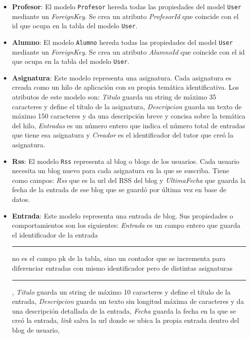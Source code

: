 \documentclass[a4paper, 12pt]{book}
\begin{document}
\begin{itemize}
  \texttt{User} contendr\'a todos los usuarios de aplicaci\'on previamente registrados, y ninguno de \'estos podr\'a coincidir con otro en nombre de usuario
  puesto que en la p\'agina de registro se aplica un filtro al introducir el dato \textit{Username}.
  \item {\bfseries Profesor}: El modelo \texttt{Profesor} hereda todas las propiedades del model \texttt{User} mediante un \textit{ForeignKey}. Se crea un
  atributo \textit{ProfesorId} que coincide con el id que ocupa en la tabla del modelo \texttt{User}.
  \item {\bfseries Alumno}: El modelo \texttt{Alumno} hereda todas las propiedades del model \texttt{User} mediante un \textit{ForeignKey}. Se crea un
  atributo \textit{AlumnoId} que coincide con el id que ocupa en la tabla del modelo \texttt{User}.
  \item {\bfseries Asignatura}: Este modelo representa una asignatura. Cada asignatura es creada como un hilo de aplicaci\'on con su propia tem\'atica
  identificativa. Los atributos de este modelo son: \textit{Titulo} guarda un string de m\'aximo 35 caracteres y define el t\'itulo de la asignatura, 
  \textit{Descripcion} guarda un texto de m\'aximo 150 caracteres y da una descripci\'on breve y concisa sobre la tem\'atica del hilo, \textit{Entradas} 
  es un n\'umero entero que indica el n\'umero total de entradas que tiene esa asignatura y \textit{Creador} es el identificador del tutor que cre\'o la
  asignatura.
  \item {\bfseries Rss}: El modelo \texttt{Rss} representa al blog o blogs de los usuarios. Cada usuario necesita un blog nuevo para cada asignatura en la
  que se suscriba. Tiene como campos: \textit{Rss} que es la url del RSS del blog y \textit{UltimaFecha} que guarda la fecha de la entrada de ese blog 
  que se guard\'o por \'ultima vez en base de datos.
  \item {\bfseries Entrada}: Este modelo representa una entrada de blog. Sus propiedades o comportamientos son los siguientes: \textit{Entrada} es un campo 
  entero que guarda el identificador de la entrada \rule[1mm]{4mm}{0.1mm}no es el campo pk de la tabla, sino un contador que se incrementa para diferenciar
  entradas con mismo identificador pero de distintas asignaturas\rule[1mm]{4mm}{0.1mm}, \textit{Titulo} guarda un string de m\'aximo 10 caracteres y define 
  el t\'itulo de la entrada, \textit{Descripcion} guarda un texto sin longitud m\'axima de caracteres y da una descripci\'on detallada de la entrada,
  \textit{Fecha} guarda la fecha en la que se cre\'o la entrada, \textit{link} salva la url donde se ubica la propia entrada dentro del blog de usuario, 

\end{itemize}
\end{document}
